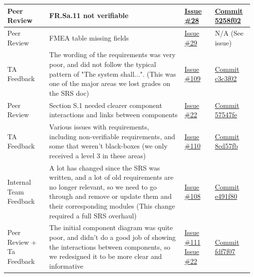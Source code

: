 \documentclass{article}
\begin{document}
\begin{landscape}
\begin{tabularx}{\linewidth}{|P{2.3cm}|Y|P{2.5cm}|P{3.5cm}|}
        \hline
        Peer Review &
        FR.Sa.11 not verifiable &
        \href{https://github.com/AlgoCatan/RLCatan/issues/28}{Issue \#28} &
        \href{https://github.com/AlgoCatan/RLCatan/commit/5258f02568fac29461190a2092b85c8cf5e54813}{Commit 5258f02} \\

        \hline
        Peer Review &
        FMEA table missing fields &
        \href{https://github.com/AlgoCatan/RLCatan/issues/29}{Issue \#29} &
        N/A (See issue) \\

        \hline
        TA Feedback &
        The wording of the requirements was very poor, and did not follow the typical pattern of "The system shall...". (This was one of the major areas we lost grades on the SRS doc) &
        \href{https://github.com/AlgoCatan/RLCatan/issues/109}{Issue \#109} &
        \href{https://github.com/AlgoCatan/RLCatan/commit/c3c3f023ea6e9fe4c5fcb4556fc0c172765f1e45}{Commit c3c3f02} \\

        \hline
        Peer Review &
        Section S.1 needed clearer component interactions and links between components &
        \href{https://github.com/AlgoCatan/RLCatan/issues/22}{Issue \#22} &
        \href{https://github.com/AlgoCatan/RLCatan/commit/57547fead57e4b5eda825a54963c6f3978c4d145}{Commit 57547fe} \\

        \hline
        TA Feedback &
        Various issues with requirements, including non-verifiable requirements, and some that weren't black-boxes (we only received a level 3 in these areas)&
        \href{https://github.com/AlgoCatan/RLCatan/issues/110}{Issue \#110} &
        \href{https://github.com/AlgoCatan/RLCatan/commit/8cd57fb6091a0d4f8080813ae268e0e12f5f78e5}{Commit 8cd57fb} \\

        \hline
        Internal Team Feedback & A lot has changed since the SRS was written, and a lot of old requirements are no longer relevant, so we need to go through and remove or update them and their corresponding modules (This change required a full SRS overhaul) &
        \href{https://github.com/AlgoCatan/RLCatan/issues/108}{Issue \#108} &
        \href{https://github.com/AlgoCatan/RLCatan/commit/e491f806d3093322d91c50669c1df3bd07be9287}{Commit e491f80} \\

        \hline
        Peer Review + Ta Feedback & The initial component diagram was quite poor, and didn't do a good job of showing the interactions between components, so we redesigned it to be more clear and informative &
        \href{https://github.com/AlgoCatan/RLCatan/issues/111}{Issue \#111} 
        \href{https://github.com/AlgoCatan/RLCatan/issues/22}{Issue \#22} &
        \href{https://github.com/AlgoCatan/RLCatan/commit/fdf7f07bfa593bba618216424de741dd8d8628f4}{Commit fdf7f07} \\


\end{tabularx}
\end{landscape}
\end{document}
